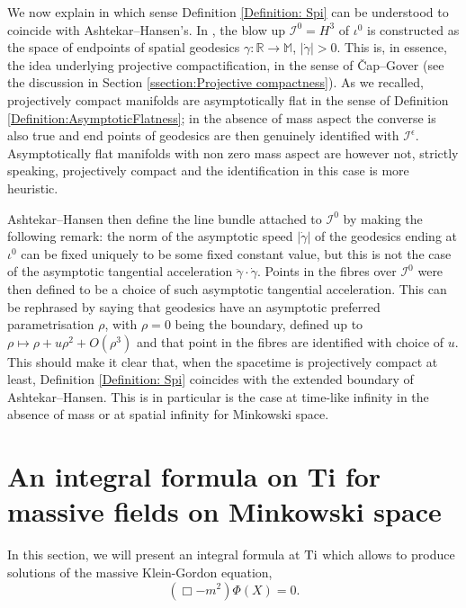 \documentclass[a4paper, 10pt]{article}
\theoremstyle{remark}
\newcommand{\Ti}{\textnormal{Ti}}
\begin{document}
We now explain in which sense Definition \ref{Definition: Spi} can be understood to coincide with Ashtekar--Hansen's. In \cite{ashtekar_unified_1978}, the blow up $\mathcal{I}^0=H^{3}$ of $\iota^0$ is constructed as the space of endpoints of spatial geodesics $\gamma:\mathbb{R} \to \mathbb{M}$, $|\dot{\gamma}|>0$. This is, in essence, the idea underlying projective compactification, in the sense of Čap--Gover \cite{Cap:2014aa,Cap:2014ab} (see the discussion in Section \ref{ssection:Projective compactness}). As we recalled, projectively compact manifolds are asymptotically flat in the sense of Definition \ref{Definition:AsymptoticFlatness}; in the absence of mass aspect the converse is also true and end points of geodesics are then genuinely identified with $\mathcal{I}^{\epsilon}$. Asymptotically flat manifolds with non zero mass aspect are however not, strictly speaking, projectively compact and the identification in this case is more heuristic. 

Ashtekar--Hansen then define the line bundle attached to $\mathcal{I}^0$ by making the following remark: the norm of the asymptotic speed $|\dot\gamma|$ of the geodesics ending at $\iota^0$ can be fixed uniquely to be some fixed constant value, but this is not the case of the asymptotic tangential acceleration $\ddot{\gamma}\cdot \dot{\gamma}$. Points in the fibres over $\mathcal{I}^0$ were then defined to be a choice of such asymptotic tangential acceleration. This can be rephrased by saying that geodesics have an asymptotic preferred parametrisation $\rho$, with $\rho=0$ being the boundary, defined up to $\rho \mapsto \rho + u \rho^2 + O(\rho^3)$ and that point in the fibres are identified with choice of $u$. This should make it clear that, when the spacetime is projectively compact at least, Definition \ref{Definition: Spi} coincides with the extended boundary of Ashtekar--Hansen. This is in particular is the case at time-like infinity in the absence of mass or at spatial infinity for Minkowski space.




\section{An integral formula on Ti for massive fields on Minkowski space}\label{Section: An integral formula on Ti}

In this section, we will present an integral formula at $\Ti$ which allows to produce solutions of the massive Klein-Gordon equation,
%
\begin{equation*}
    \left( \Box - m^2 \right) \Phi(X) = 0.
\end{equation*}
\end{document}
